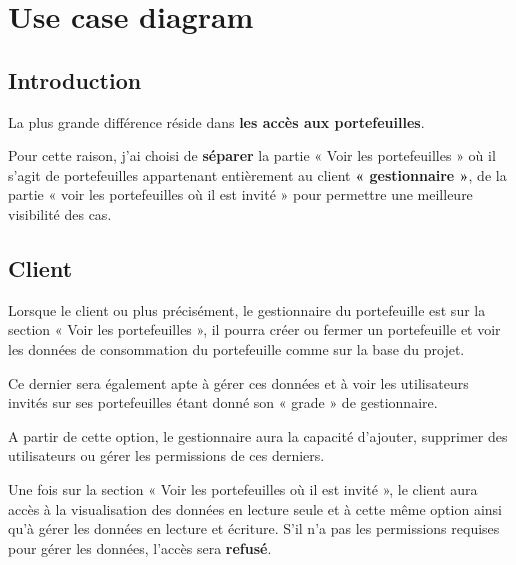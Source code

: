 \section{Use case diagram}
\subsection{Introduction}
\begin{flushleft}
La plus grande différence réside dans \textbf{les accès aux portefeuilles}.
\end{flushleft}

\begin{flushleft}
Pour cette raison, j’ai choisi de \textbf{séparer} la partie « Voir les portefeuilles » où il s’agit de portefeuilles appartenant entièrement au client \textbf{« gestionnaire »}, de la partie « voir les portefeuilles où il est invité » pour permettre une meilleure visibilité des cas.
\end{flushleft}

\subsection{Client}
\begin{flushleft}
Lorsque le client ou plus précisément, le gestionnaire du portefeuille est sur la section « Voir les portefeuilles », il pourra créer ou fermer un portefeuille et voir les données de consommation du portefeuille comme sur la base du projet.
\end{flushleft} 

\begin{flushleft}
Ce dernier sera également apte à gérer ces données et à voir les utilisateurs invités sur ses portefeuilles étant donné son « grade » de gestionnaire. 
\end{flushleft}

\begin{flushleft}
A partir de cette option, le gestionnaire aura la capacité d’ajouter, supprimer des utilisateurs ou gérer les permissions de ces derniers.
\end{flushleft}

\begin{flushleft}
Une fois sur la section « Voir les portefeuilles où il est invité », le client aura accès à la visualisation des données en lecture seule et à cette même option ainsi qu’à gérer les données en lecture et écriture. 
S’il n’a pas les permissions requises pour gérer les données, l’accès sera \textbf{refusé}.
\end{flushleft}

